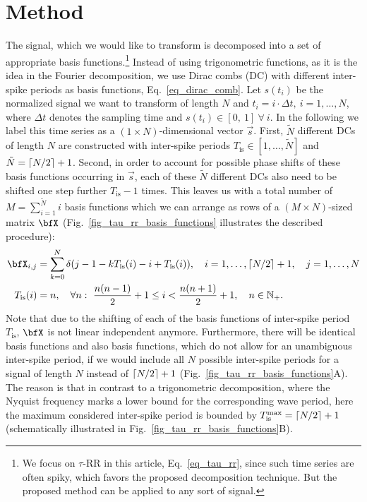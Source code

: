 \documentclass[entropy,article,submit,pdftex,moreauthors]{Definitions/mdpi}
\DeclarePairedDelimiter\ceil{\lceil}{\rceil}
\begin{document}
\section{Method}\label{sec_tau_rr_method}
    
The signal, which we would like to transform is decomposed into a set of appropriate basis functions.\footnote{We focus on $\tau$-RR in this article, Eq.~\eqref{eq_tau_rr}, since 
such time series are often spiky, which favors the proposed decomposition technique. But the proposed method can be applied to any sort of signal.} Instead of using trigonometric 
functions, as it is the idea in the Fourier decomposition, we use Dirac combs (DC) with 
different inter-spike periods as basis functions, Eq.~\eqref{eq_dirac_comb}. Let $s(t_i)$ be the normalized signal we want to transform of length $N$ and 
$t_i=i\cdot \Delta t,~i=1,\ldots,N$, where $\Delta t$ denotes the sampling time and $s(t_i) \in [0,\ 1]\ \forall\ i$. In the following we label this time series as a $(1\times N)$-dimensional 
vector $\vec{s}$. 
First, $\tilde{N}$ different DCs of length $N$ are constructed with inter-spike periods $T_\text{is} \in [1,\ldots,\tilde{N}]$ and $\tilde{N}=\ceil*{N/2}+1$. Second, in order to account 
for possible phase shifts of 
these basis functions occurring in $\vec{s}$, each of these $\tilde{N}$ different DCs also need to be shifted one step further $T_\text{is}-1$ times. This leaves us with a total number of 
$M = \sum_{i=1}^{\tilde{N}}i$ 
basis functions which we can arrange as rows of a $(M\times N)$-sized matrix $\bfX$
(Fig.~\ref{fig_tau_rr_basis_functions} illustrates the described procedure):
\begin{align}
\label{eq_basis_matrix} 
\bfX_{i,j} &= \sum_{k=0}^{N}\delta\left(j-1-kT_\text{is}(i)-i+T_\text{is}(i) \right), \quad i=1,\dots,\ceil*{N/2}+1, \quad j=1,\dots,N\\
\label{eq_T_is} T_\text{is}(i)&= n, \quad \forall n:~ \frac{n(n-1)}{2} + 1 \leq i <  \frac{n(n+1)}{2} + 1,\quad n \in \mathbb{N}_+.
\end{align}
Note that due to the shifting of each of the basis functions of inter-spike period $T_\text{is}$, $\bfX$ is not linear independent anymore. 
Furthermore, there will be identical basis functions and also basis functions, which do not allow for an unambiguous inter-spike period, 
if we would include all $N$ possible inter-spike periods for a signal of length $N$ instead of $\ceil*{N/2}+1$ (Fig.~\ref{fig_tau_rr_basis_functions}A). 
The reason is that in contrast to a trigonometric decomposition, where the Nyquist frequency marks a lower bound for the corresponding wave period, here 
the maximum considered inter-spike period is bounded by $T_{\text{is}}^{\text{max}} = \ceil*{N/2}+1$ (schematically illustrated in 
Fig.~\ref{fig_tau_rr_basis_functions}B).\\ 
\end{document}
